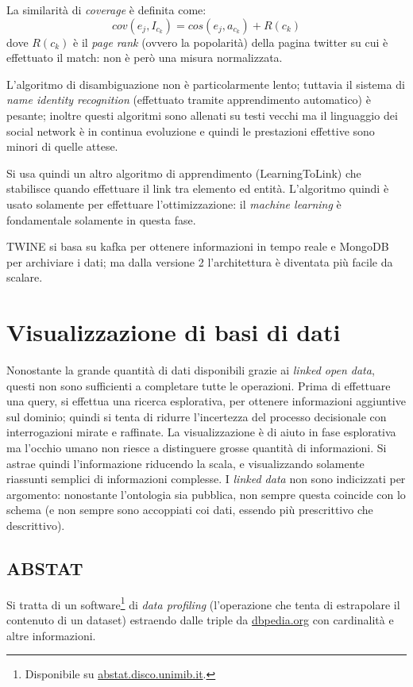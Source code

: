 \documentclass[11pt]{article}
\begin{document}
La similarità di \textit{coverage} è definita come:
\begin{equation*}
  cov(e_j, I_{c_k}) = cos(e_j, a_{c_k}) + R(c_k)
\end{equation*}
dove $R(c_k)$ è il \textit{page rank} (ovvero la popolarità) della pagina twitter su cui è effettuato il match: non è però una misura normalizzata.

L'algoritmo di disambiguazione non è particolarmente lento; tuttavia il sistema di \textit{name identity recognition} (effettuato tramite apprendimento automatico) è pesante; inoltre questi algoritmi sono allenati su testi vecchi ma il linguaggio dei social network è in continua evoluzione e quindi le prestazioni effettive sono minori di quelle attese.

Si usa quindi un altro algoritmo di apprendimento (LearningToLink) che stabilisce quando effettuare il link tra elemento ed entità.
L'algoritmo quindi è usato solamente per effettuare l'ottimizzazione: il \textit{machine learning} è fondamentale solamente in questa fase.

TWINE si basa su kafka per ottenere informazioni in tempo reale e MongoDB per archiviare i dati; ma dalla versione 2 l'architettura è diventata più facile da scalare.

\section{Visualizzazione di basi di dati}
Nonostante la grande quantità di dati disponibili grazie ai \textit{linked open data}, questi non sono sufficienti a completare tutte le operazioni.
Prima di effettuare una query, si effettua una ricerca esplorativa, per ottenere informazioni aggiuntive sul dominio; quindi si tenta di ridurre l'incertezza del processo decisionale con interrogazioni mirate e raffinate.
La visualizzazione è di aiuto in fase esplorativa ma l'occhio umano non riesce a distinguere grosse quantità di informazioni.
Si astrae quindi l'informazione riducendo la scala, e visualizzando solamente riassunti semplici di informazioni complesse.
I \textit{linked data} non sono indicizzati per argomento: nonostante l'ontologia sia pubblica, non sempre questa coincide con lo schema (e non sempre sono accoppiati coi dati, essendo più prescrittivo che descrittivo).

\subsection{ABSTAT}
Si tratta di un software\footnote{Disponibile su \url{abstat.disco.unimib.it}.} di \textit{data profiling} (l'operazione che tenta di estrapolare il contenuto di un dataset) estraendo dalle triple da \url{dbpedia.org} con cardinalità e altre informazioni.
\end{document}
